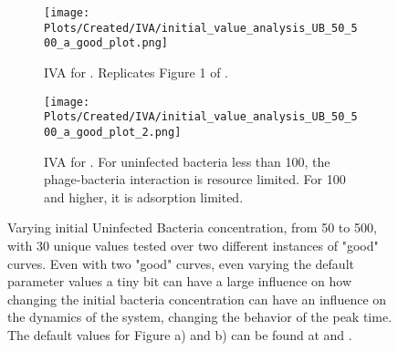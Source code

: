 \begin{figure}
    \centering
    \begin{subfigure}{1\linewidth}
        \centering
        \texttt{[image: Plots/Created/IVA/initial\_value\_analysis\_UB\_50\_500\_a\_good\_plot.png]}
        \caption{
            IVA for . 
            Replicates Figure 1 of \citet{mullaExtremeDiversityPhage2024}. 
        }
        \label{fig:created:initial_value_analysis_UB_50_500_a_good_plot}
    \end{subfigure}
    \hfill
    \begin{subfigure}{1\linewidth}
        \centering
        \texttt{[image: Plots/Created/IVA/initial\_value\_analysis\_UB\_50\_500\_a\_good\_plot\_2.png]}
        \caption{
            IVA for . 
            For uninfected bacteria less than 100, the phage-bacteria interaction is resource limited. 
            For 100 and higher, it is adsorption limited. 
        }
        \label{fig:created:initial_value_analysis_UB_50_500_a_good_plot_2}
    \end{subfigure}
    \caption{
        Varying initial Uninfected Bacteria concentration, from 50 to 500, with 30 unique values tested over two different instances of "good" curves. 
        Even with two "good" curves, even varying the default parameter values a tiny bit can have a large influence on how changing the initial bacteria concentration can have an influence on the dynamics of the system, changing the behavior of the peak time. 
        The default values for Figure a) and b) can be found at  and . 
    }
\end{figure}